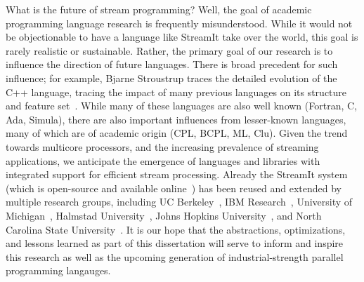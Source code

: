 What is the future of stream programming?  Well, the goal of academic
programming language research is frequently misunderstood.  While it
would not be objectionable to have a language like StreamIt take over
the world, this goal is rarely realistic or sustainable.  Rather, the
primary goal of our research is to influence the direction of future
languages.  There is broad precedent for such influence; for example,
Bjarne Stroustrup traces the detailed evolution of the C++ language,
tracing the impact of many previous languages on its structure and
feature set~\cite{stroustrup_design_1994}.  While many of these
languages are also well known (Fortran, C, Ada, Simula), there are
also important influences from lesser-known languages, many of which
are of academic origin (CPL, BCPL, ML, Clu).  Given the trend towards
multicore processors, and the increasing prevalence of streaming
applications, we anticipate the emergence of languages and libraries
with integrated support for efficient stream processing.  Already the
StreamIt system (which is open-source and available
online~\cite{streamitweb}) has been reused and extended by multiple
research groups, including UC
Berkeley~\cite{mani-permutations,bit-streaming}, IBM
Research~\cite{huang_liquid_2008,hormati_optimus:_2008}, University of
Michigan~\cite{kudlur_orchestratingexecution_2008,hormati_optimus:_2008},
Halmstad University~\cite{ola-techrep,andersson_model_07}, Johns
Hopkins University~\cite{duca-thesis}, and North Carolina State
University~\cite{won-thesis}.  It is our hope that the abstractions,
optimizations, and lessons learned as part of this dissertation will
serve to inform and inspire this research as well as the upcoming
generation of industrial-strength parallel programming langauges.

